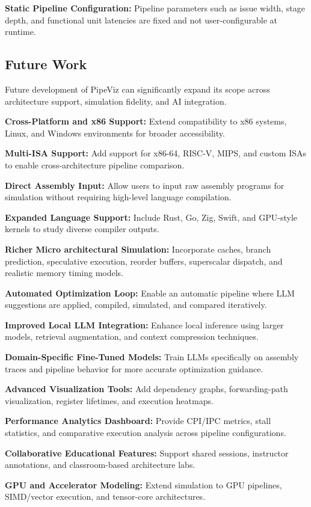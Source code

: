 \textbf{Static Pipeline Configuration:} Pipeline parameters such as issue width, stage depth, and functional unit latencies are fixed and not user-configurable at runtime.

\subsection*{Future Work}

Future development of PipeViz can significantly expand its scope across architecture support, simulation fidelity, and AI integration.

\textbf{Cross-Platform and x86 Support:} Extend compatibility to x86 systems, Linux, and Windows environments for broader accessibility.

\textbf{Multi-ISA Support:} Add support for x86-64, RISC-V, MIPS, and custom ISAs to enable cross-architecture pipeline comparison.

\textbf{Direct Assembly Input:} Allow users to input raw assembly programs for simulation without requiring high-level language compilation.

\textbf{Expanded Language Support:} Include Rust, Go, Zig, Swift, and GPU-style kernels to study diverse compiler outputs.

\textbf{Richer Micro architectural Simulation:} Incorporate caches, branch prediction, speculative execution, reorder buffers, superscalar dispatch, and realistic memory timing models.

\textbf{Automated Optimization Loop:} Enable an automatic pipeline where LLM suggestions are applied, compiled, simulated, and compared iteratively.

\textbf{Improved Local LLM Integration:} Enhance local inference using larger models, retrieval augmentation, and context compression techniques.

\textbf{Domain-Specific Fine-Tuned Models:} Train LLMs specifically on assembly traces and pipeline behavior for more accurate optimization guidance.

\textbf{Advanced Visualization Tools:} Add dependency graphs, forwarding-path visualization, register lifetimes, and execution heatmaps.

\textbf{Performance Analytics Dashboard:} Provide CPI/IPC metrics, stall statistics, and comparative execution analysis across pipeline configurations.

\textbf{Collaborative Educational Features:} Support shared sessions, instructor annotations, and classroom-based architecture labs.

\textbf{GPU and Accelerator Modeling:} Extend simulation to GPU pipelines, SIMD/vector execution, and tensor-core architectures.